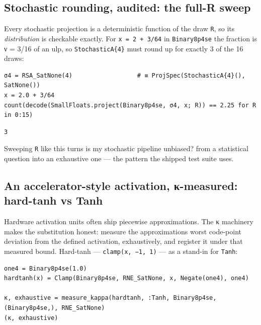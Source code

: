 \subsection{Stochastic rounding, audited: the full-R sweep}



\label{6013932738708787830}{}


Every stochastic projection is a deterministic function of the draw \texttt{R}, so its \emph{distribution} is checkable exactly. For \texttt{x = 2 + 3/64} in \texttt{Binary8p4se} the fraction is ν = 3/16 of an ulp, so \texttt{StochasticA\{4\}} must round up for exactly 3 of the 16 draws:




\begin{verbatim}
σ4 = RSA_SatNone(4)                  # ≡ ProjSpec(StochasticA{4}(), SatNone())
x = 2.0 + 3/64
count(decode(SmallFloats.project(Binary8p4se, σ4, x; R)) == 2.25 for R in 0:15)
\end{verbatim}




\begin{verbatim}
3
\end{verbatim}



Sweeping \texttt{R} like this turns {\textquotedbl}is my stochastic pipeline unbiased?{\textquotedbl} from a statistical question into an exhaustive one — the pattern the shipped test suite uses.



\subsection{An accelerator-style activation, κ-measured: hard-tanh vs Tanh}



\label{7978642076077323668}{}


Hardware activation units often ship piecewise approximations. The κ machinery makes the substitution honest: measure the approximation{\textquotesingle}s worst code-point deviation from the defined activation, exhaustively, and register it under that measured bound. Hard-tanh — \texttt{clamp(x, −1, 1)} — as a stand-in for \texttt{Tanh}:




\begin{verbatim}
one4 = Binary8p4se(1.0)
hardtanh(x) = Clamp(Binary8p4se, RNE_SatNone, x, Negate(one4), one4)

κ, exhaustive = measure_kappa(hardtanh, :Tanh, Binary8p4se, (Binary8p4se,), RNE_SatNone)
(κ, exhaustive)
\end{verbatim}




